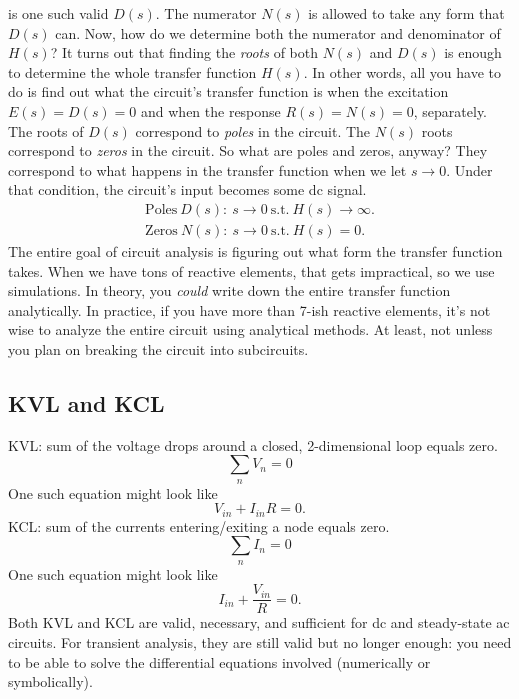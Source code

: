 \documentclass[12pt]{report}
\begin{document}
is one such valid $D(s)$. The numerator $N(s)$ is allowed to take any form that $D(s)$ can. Now, how do we determine both the numerator and denominator of $H(s)$? It turns out that finding the \textit{roots} of both $N(s)$ and $D(s)$ is enough to determine the whole transfer function $H(s)$. In other words, all you have to do is find out what the circuit's transfer function is when the excitation $E(s) = D(s) = 0$ and when the response $R(s) = N(s) = 0$, separately. The roots of $D(s)$ correspond to \textit{poles} in the circuit. The $N(s)$ roots correspond to \textit{zeros} in the circuit. So what are poles and zeros, anyway? They correspond to what happens in the transfer function when we let $s \rightarrow 0$. Under that condition, the circuit's input becomes some dc signal.
\begin{align}
\label{eq:22}
 \text{Poles}\ D(s) \colon \ s \rightarrow 0 \  \text{s.t.} \  H(s) \rightarrow \infty. \\
\text{Zeros}\ N(s) \colon \ s \rightarrow 0 \  \text{s.t.} \  H(s) = 0.
\end{align}
The entire goal of circuit analysis is figuring out what form the transfer function takes. When we have tons of reactive elements, that gets impractical, so we use simulations. In theory, you \textit{could} write down the entire transfer function analytically. In practice, if you have more than 7-ish reactive elements, it's not wise to analyze the entire circuit using analytical methods. At least, not unless you plan on breaking the circuit into subcircuits.

\subsection{KVL and KCL}
KVL: sum of the voltage drops around a closed, 2-dimensional loop equals zero.
\begin{equation}
\label{eq:24}
\sum_{n} V_{n} = 0
\end{equation}
One such equation might look like
\begin{equation}
\label{eq:25}
V_{in} + I_{in} R = 0.
\end{equation}
KCL: sum of the currents entering/exiting a node equals zero.
\begin{equation}
\label{eq:26}
\sum_{n} I_{n} = 0
\end{equation}
One such equation might look like
\begin{equation}
\label{eq:27}
I_{in} + \frac{V_{in}}{R} = 0.
\end{equation}
Both KVL and KCL are valid, necessary, and sufficient for dc and steady-state ac circuits. For transient analysis, they are still valid but no longer enough: you need to be able to solve the differential equations involved (numerically or symbolically).
\end{document}
